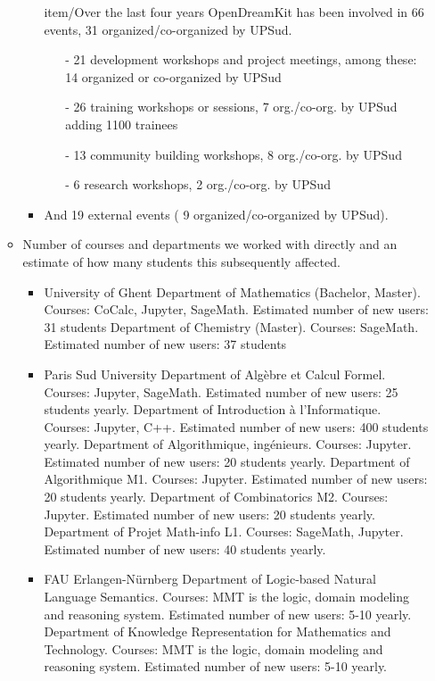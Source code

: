 \begin{enumerate}
\begin{itemize}
\begin{itemize} 
item/Over the last four years OpenDreamKit has been involved in 66 events, 31 organized/co-organized by UPSud.
\begin{itemize} 
\item[-] 21 development workshops and project meetings, among these: 14 organized or co-organized by UPSud
\item[-] 26 training workshops or sessions,  7 org./co-org. by UPSud adding 1100 trainees
\item[-] 13 community building workshops, 8 org./co-org. by UPSud
\item[-] 6 research workshops, 2 org./co-org. by UPSud
\end{itemize} 
\item And 19 external events ( 9 organized/co-organized by UPSud).
\end{itemize}

\item Number of courses and departments we worked with directly and an estimate of how many students this subsequently affected.

\begin{itemize}
  \item University of Ghent
  Department of Mathematics (Bachelor, Master). Courses: CoCalc, Jupyter, SageMath. Estimated number of new users: 31 students
  Department of Chemistry (Master). Courses: SageMath. Estimated number of new users: 37 students
  
  \item Paris Sud University 
  Department of Algèbre et Calcul Formel. Courses: Jupyter, SageMath. Estimated number of new users: 25 students yearly.
  Department of Introduction à l'Informatique. Courses: Jupyter, C++. Estimated number of new users: 400 students yearly.
  Department of Algorithmique, ingénieurs. Courses: Jupyter. Estimated number of new users: 20 students yearly.
  Department of Algorithmique M1. Courses: Jupyter. Estimated number of new users: 20 students yearly.
  Department of Combinatorics M2. Courses: Jupyter. Estimated number of new users: 20 students yearly.
  Department of Projet Math-info L1. Courses: SageMath, Jupyter. Estimated number of new users: 40 students yearly.
  
  \item FAU Erlangen-Nürnberg
  Department of Logic-based Natural Language Semantics. Courses: MMT is the logic, domain modeling and reasoning system. Estimated number of new users: 5-10 yearly. 
  Department of Knowledge Representation for Mathematics and Technology. Courses: MMT is the logic, domain modeling and reasoning system. Estimated number of new users: 5-10 yearly. 
 

\end{itemize}
\end{itemize}
\end{enumerate}
